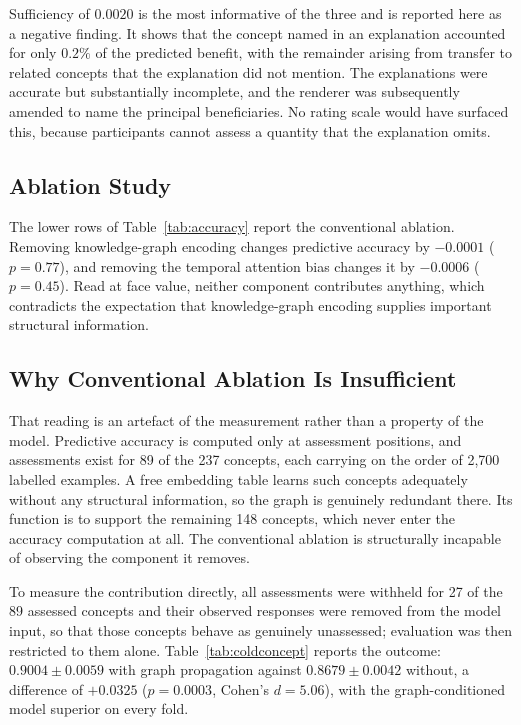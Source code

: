 Sufficiency of $0.0020$ is the most informative of the three and is reported here as a
negative finding. It shows that the concept named in an explanation accounted for only
$0.2\%$ of the predicted benefit, with the remainder arising from transfer to related
concepts that the explanation did not mention. The explanations were accurate but
substantially incomplete, and the renderer was subsequently amended to name the principal
beneficiaries. No rating scale would have surfaced this, because participants cannot
assess a quantity that the explanation omits.

\subsection{Ablation Study}

The lower rows of Table~\ref{tab:accuracy} report the conventional ablation. Removing knowledge-graph encoding changes predictive accuracy by
$-0.0001$ ($p = 0.77$), and removing the temporal attention bias changes it by $-0.0006$
($p = 0.45$). Read at face value, neither component contributes anything, which
contradicts the expectation that knowledge-graph encoding supplies important structural
information.

\subsection{Why Conventional Ablation Is Insufficient}

That reading is an artefact of the measurement rather than a property of the model.
Predictive accuracy is computed only at assessment positions, and assessments exist for 89
of the 237 concepts, each carrying on the order of 2{,}700 labelled examples. A free
embedding table learns such concepts adequately without any structural information, so the
graph is genuinely redundant there. Its function is to support the remaining 148 concepts,
which never enter the accuracy computation at all. The conventional ablation is
structurally incapable of observing the component it removes.

To measure the contribution directly, all assessments were withheld for 27 of the 89
assessed concepts and their observed responses were removed from the model input, so that
those concepts behave as genuinely unassessed; evaluation was then restricted to them
alone. Table~\ref{tab:coldconcept} reports the outcome: $0.9004 \pm 0.0059$ with graph
propagation against $0.8679 \pm 0.0042$ without, a difference of $+0.0325$
($p = 0.0003$, Cohen's $d = 5.06$), with the graph-conditioned model superior on every
fold.

